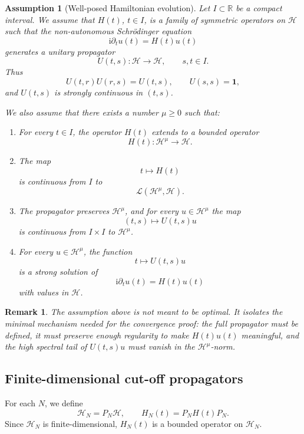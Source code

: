 \documentclass[10pt,a4paper]{amsart}
\newtheorem{assumption}[theorem]{Assumption}
\newtheorem{remark}[theorem]{Remark}
\newcommand{\Hilb}{\mathcal H}
\newcommand{\Id}{\mathbf 1}
\newcommand{\ii}{\mathrm i}
\begin{document}
\begin{assumption}[Well-posed Hamiltonian evolution]
\label{ass:full-dynamics}
Let \(I\subset\mathbb R\) be a compact interval.  We assume that
\(H(t)\), \(t\in I\), is a family of symmetric operators on \(\Hilb\)
such that the non-autonomous Schr\"odinger equation
\[
        \ii\partial_t u(t)=H(t)u(t)
\]
generates a unitary propagator
\[
        U(t,s):\Hilb\to\Hilb,
        \qquad s,t\in I.
\]
Thus
\[
        U(t,r)U(r,s)=U(t,s),
        \qquad
        U(s,s)=\Id,
\]
and \(U(t,s)\) is strongly continuous in \((t,s)\).

We also assume that there exists a number \(\mu\geq0\) such that:

\begin{enumerate}[label=\textup{(\roman*)}]
\item
For every \(t\in I\), the operator \(H(t)\) extends to a bounded
operator
\[
        H(t):\Hilb^\mu\longrightarrow \Hilb.
\]

\item
The map
\[
        t\longmapsto H(t)
\]
is continuous from \(I\) to
\[
        \mathcal L(\Hilb^\mu,\Hilb).
\]

\item
The propagator preserves \(\Hilb^\mu\), and for every \(u\in\Hilb^\mu\)
the map
\[
        (t,s)\longmapsto U(t,s)u
\]
is continuous from \(I\times I\) to \(\Hilb^\mu\).

\item
For every \(u\in\Hilb^\mu\), the function
\[
        t\longmapsto U(t,s)u
\]
is a strong solution of
\[
        \ii\partial_t u(t)=H(t)u(t)
\]
with values in \(\Hilb\).
\end{enumerate}
\end{assumption}

\begin{remark}
The assumption above is not meant to be optimal.  It isolates the
minimal mechanism needed for the convergence proof: the full propagator
must be defined, it must preserve enough regularity to make \(H(t)u(t)\)
meaningful, and the high spectral tail of \(U(t,s)u\) must vanish in the
\(\Hilb^\mu\)-norm.
\end{remark}

\subsection{Finite-dimensional cut-off propagators}

For each \(N\), we define
\[
        \Hilb_N=P_N\Hilb,
        \qquad
        H_N(t)=P_NH(t)P_N.
\]
Since \(\Hilb_N\) is finite-dimensional, \(H_N(t)\) is a bounded
operator on \(\Hilb_N\).
\end{document}
